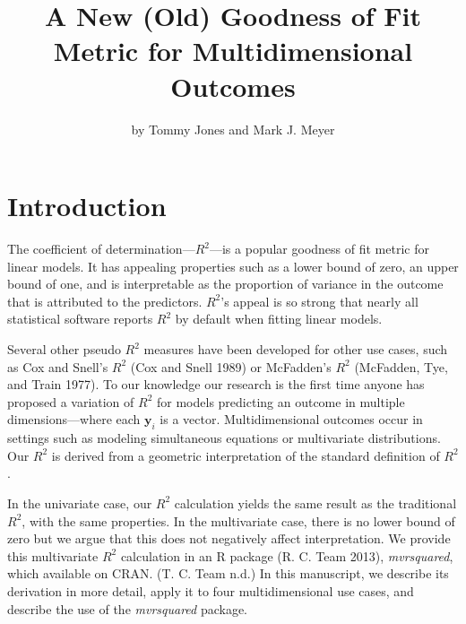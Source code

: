 \title{A New (Old) Goodness of Fit Metric for Multidimensional Outcomes}


\author{by Tommy Jones and Mark J. Meyer}

\maketitle


\hypertarget{introduction}{%
\section{Introduction}\label{introduction}}

The coefficient of determination---\(R^2\)---is a popular goodness of fit metric for linear models. It has appealing properties such as a lower bound of zero, an upper bound of one, and is interpretable as the proportion of variance in the outcome that is attributed to the predictors. \(R^2\)'s appeal is so strong that nearly all statistical software reports \(R^2\) by default when fitting linear models.

Several other pseudo \(R^2\) measures have been developed for other use cases, such as Cox and Snell's \(R^2\) (Cox and Snell 1989) or McFadden's \(R^2\) (McFadden, Tye, and Train 1977). To our knowledge our research is the first time anyone has proposed a variation of \(R^2\) for models predicting an outcome in multiple dimensions---where each \(\boldsymbol{y}_i\) is a vector. Multidimensional outcomes occur in settings such as modeling simultaneous equations or multivariate distributions. Our \(R^2\) is derived from a geometric interpretation of the standard definition of \(R^2\).

In the univariate case, our \(R^2\) calculation yields the same result as the traditional \(R^2\), with the same properties. In the multivariate case, there is no lower bound of zero but we argue that this does not negatively affect interpretation. We provide this multivariate \(R^2\) calculation in an R package (R. C. Team 2013), \emph{mvrsquared}, which available on CRAN. (T. C. Team n.d.) In this manuscript, we describe its derivation in more detail, apply it to four multidimensional use cases, and describe the use of the \emph{mvrsquared} package.

